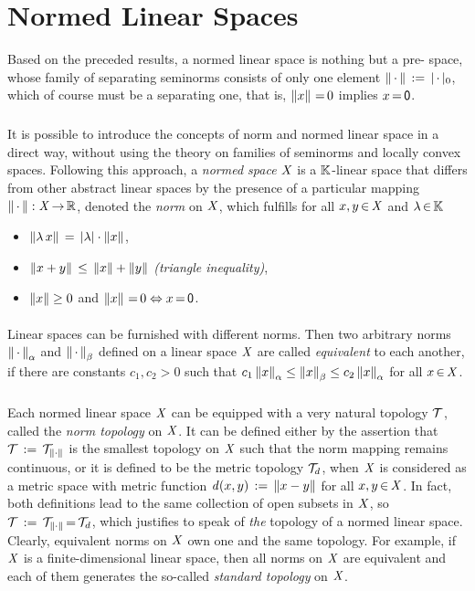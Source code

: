 \documentclass[11pt,twoside]{article}
\begin{document}
\section{Normed Linear Spaces}
Based on the preceded results,
a normed linear space is nothing but a pre-{\FRECHET} space,
whose family of separating seminorms consists of only one element
$\norm{\,\cdot\,} \eqdef \abs{\,\cdot\,} _0$,
which of course must be a separating one,
that is,
$\left\lVert x \right\rVert {\,=\,} 0$ implies $x {\,=\,} {\mathsf{0}}$.

\subparagraph{}
It is possible to introduce the concepts of norm and normed linear space
in a direct way, 
{\ie} without using the theory on families of seminorms
and locally convex spaces.
Following this approach,
a \textit{normed space} $\mathit{X}$ is a ${\mathbb{K}}$-linear space
that differs from other abstract linear spaces
by the presence of a particular mapping $\left\lVert \,\cdot\, \right\rVert: \mathit{X} {\,\to\,} {\mathbb{R}}$,
denoted the \textit{norm} on $\mathit{X}$,
which fulfills for all $x,y {\,\in\,} \mathit{X}$ and $\lambda {\,\in\,} {\mathbb{K}}$

\begin{itemize}[leftmargin=55pt,itemsep=2pt]
\item[(N-1)] \quad
$\norm{\lambda \, x} \= \abs{\lambda} \cdot \norm{x}$,

\item[(N-2)] \quad
$\left\lVert x+y \right\rVert \, \leq \, \left\lVert x \right\rVert + \left\lVert y \right\rVert$
\; \textit{(triangle inequality)},

\item[(N-3)] \quad
$\left\lVert x \right\rVert \geq 0$ and $\left\lVert x \right\rVert {\,=\,} 0 \Leftrightarrow x {\,=\,} {\mathsf{0}}$.
\end{itemize}

\paragraph{}
Linear spaces can be furnished with different norms.
Then two arbitrary norms $\left\lVert \,\cdot\, \right\rVert_{\alpha}$
and $\left\lVert \,\cdot\, \right\rVert_{\beta}$ defined on a linear space $\mathit{X}$
are called \textit{equivalent} to each another,
if there are constants $c_1,c_2 > 0$ such that
$
c_1 \left\lVert x \right\rVert_{\alpha} \leq \left\lVert x \right\rVert_{\beta}  \leq c_2 \left\lVert x \right\rVert_{\alpha} 
$
for all $x {\,\in\,} \mathit{X}$.

\subparagraph{} %
Each normed linear space $\mathit{X}$ can be equipped
with a very natural topology $\mathcal{T}$,
called the \textit{norm topology} on $\mathit{X}$.
It can be defined either by the assertion
that $\mathcal{T} \,:=\, \mathcal{T}_{\left\lVert \cdot \right\rVert}$ is the smallest topology on $\mathit{X}$
such that the norm mapping remains continuous,
or it is defined to be the metric topology $\mathcal{T}_d$,
when $\mathit{X}$ is considered as a metric space with metric function
$\mathit{d}(x,y) \,:=\, \left\lVert x-y \right\rVert$ for all $x,y {\,\in\,} \mathit{X}$.
In fact,
both definitions lead to the same collection of open subsets in $\mathit{X}$,
so $\mathcal{T} \,:=\, \mathcal{T}_{\left\lVert \cdot \right\rVert} {\,=\,} \mathcal{T}_d$,
which justifies to speak of \textit{the} topology of a normed linear space.
Clearly,
equivalent norms on $\mathit{X}$ own one and the same topology.
For example,
if $\mathit{X}$ is a finite-dimensional linear space,
then all norms on $\mathit{X}$ are equivalent and each of them
generates the so-called \textit{standard topology} on $\mathit{X}$.
\end{document}
